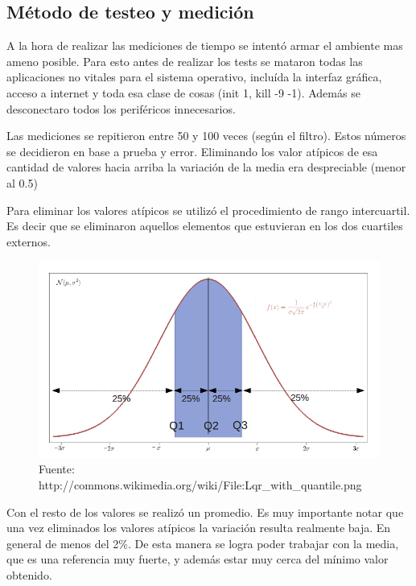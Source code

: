 \subsection*{Método de testeo y medición}

	A la hora de realizar las mediciones de tiempo se intentó armar el ambiente mas
ameno posible. Para esto antes de realizar los tests se mataron todas las aplicaciones
no vitales para el sistema operativo, incluída la interfaz gráfica, acceso a internet y
toda esa clase de cosas (init 1, kill -9 -1). Además se desconectaro todos los periféricos
innecesarios.

	Las mediciones se repitieron entre 50 y 100 veces (según el filtro). Estos números se
decidieron en base a prueba y error. Eliminando los valor atípicos de esa cantidad
de valores hacia arriba la variación de la media era despreciable (menor al 0.5)

	Para eliminar los valores atípicos se utilizó el procedimiento de rango intercuartil. Es decir
que se eliminaron aquellos elementos que estuvieran en los dos cuartiles externos.


\begin{figure}[h]
\begin{center}
  \includegraphics[scale=0.5]{secciones/consideraciones/imagenes/cuartiles.png}
\end{center}
\caption{Fuente: http://commons.wikimedia.org/wiki/File:Lqr\_with\_quantile.png}
\label{fig:cuariles}
\end{figure}

	Con el resto de los valores se realizó un promedio. Es muy importante notar que una vez eliminados los valores
atípicos la variación resulta realmente baja. En general de menos del 2\%. De esta manera se logra poder trabajar
con la media, que es una referencia muy fuerte, y además estar muy cerca del mínimo valor obtenido.

	

	

